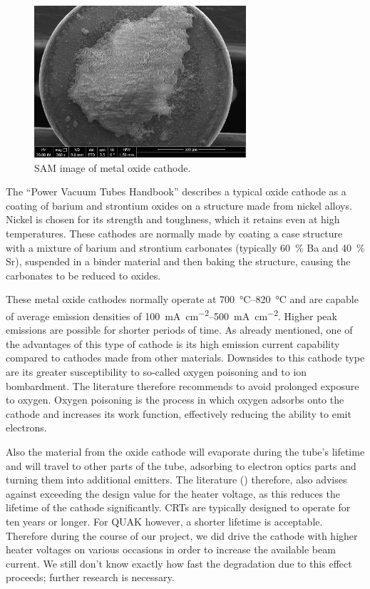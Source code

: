 \begin{figure}
	\centering
	\includegraphics[width=0.7\textwidth]{Chapters/CRT-Basics/SEM_image.png}
	\caption{SAM image of metal oxide cathode.}
	\label{fig:SEM_Cathode}
\end{figure}

The ``Power Vacuum Tubes Handbook'' \cite[chp 3.5.2.1]{Whitaker} describes a typical oxide cathode as a coating of barium and strontium oxides on a structure made from nickel alloys. Nickel is chosen for its strength and toughness, which it retains even at high temperatures. These cathodes are normally made by coating a case structure with a mixture of barium and strontium carbonates (typically \SI{60}{\percent} Ba and \SI{40}{\percent} Sr), suspended in a binder material and then baking the structure, causing the carbonates to be reduced to oxides. 

These metal oxide cathodes normally operate at \SIrange{700}{820}{\celsius} and are capable of average emission densities of \SIrange{100}{500}{\milli\ampere\per\centi\meter\squared}. Higher peak emissions are possible for shorter periods of time. As already mentioned, one of the advantages of this type of cathode is its high emission current capability compared to cathodes made from other materials. Downsides to this cathode type are its greater susceptibility to so-called oxygen poisoning and to ion bombardment. The literature therefore recommends to avoid prolonged exposure to oxygen. Oxygen poisoning is the process in which oxygen adsorbs onto the cathode and increases its work function, effectively reducing the ability to emit electrons. 


Also the material from the oxide cathode will evaporate during the tube's lifetime and will travel to other parts of the tube, adsorbing to electron optics parts and turning them into additional emitters. The literature (\cite[chp 3.5.2.1]{Whitaker}) therefore, also advises against exceeding the design value for the heater voltage, as this reduces the lifetime of the cathode significantly. CRTs are typically designed to operate for ten years or longer. For QUAK however, a shorter lifetime is acceptable. Therefore during the course of our project, we did drive the cathode with higher heater voltages on various occasions in order to increase the available beam current. We still don't know exactly how fast the degradation due to this effect proceeds; further research is necessary.  

